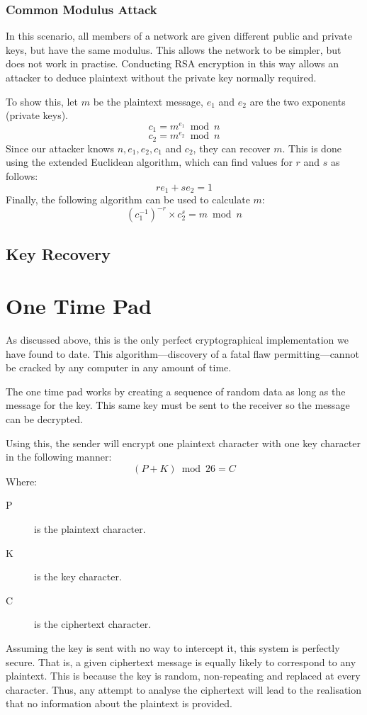 			\subsubsection{Common Modulus Attack}
				In this scenario, all members of a network are given different public and private keys, but have the same modulus.
				This allows the network to be simpler, but does not work in practise. 
				Conducting RSA encryption in this way allows an attacker to deduce plaintext without the private key normally required. 

				To show this, let $m$ be the plaintext message, $e_1$ and $e_2$ are the two exponents (private keys). 
				$$c_1 = m^{e_1}\bmod{n}$$
				$$c_2 = m^{e_2}\bmod{n}$$
				Since our attacker knows $n, e_1, e_2, c_1$ and $c_2$, they can recover $m$. 
				This is done using the extended Euclidean algorithm, which can find values for $r$ and $s$ as follows:
				$$re_1 + se_2 = 1$$
				Finally, the following algorithm can be used to calculate $m$:
				$$(c^{-1}_{1})^{-r} \times c^{s}_{2} = m\bmod{n}$$

		\subsection{Key Recovery}
	\section{One Time Pad}
		As discussed above, this is the only perfect cryptographical implementation we have found to date. 
		This algorithm---discovery of a fatal flaw permitting---cannot be cracked by any computer in any amount of time. 

		The one time pad works by creating a sequence of random data as long as the message for the key. 
		This same key must be sent to the receiver so the message can be decrypted. 

		Using this, the sender will encrypt one plaintext character with one key character in the following manner:
		$$ (P + K) \bmod{26} = C $$  
		Where:
		\begin{description}
			\item[P] is the plaintext character. 
			\item[K] is the key character.
			\item[C] is the ciphertext character.
		\end{description}

		Assuming the key is sent with no way to intercept it, this system is perfectly secure. 
		That is, a given ciphertext message is equally likely to correspond to any plaintext. 
		This is because the key is random, non-repeating and replaced at every character. 
		Thus, any attempt to analyse the ciphertext will lead to the realisation that no information about the plaintext is provided.

